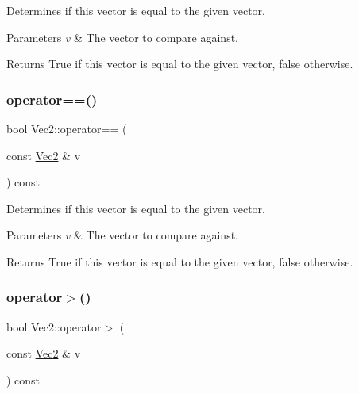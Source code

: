 Determines if this vector is equal to the given vector.


\begin{DoxyParams}{Parameters}
{\em v} & The vector to compare against.\\
\hline
\end{DoxyParams}
\begin{DoxyReturn}{Returns}
True if this vector is equal to the given vector, false otherwise. 
\end{DoxyReturn}
\mbox{\label{classVec2_a08e7dcf7a04bd18d56d41dc03104ba64}} 
\subsubsection{\texorpdfstring{operator==()}{operator==()}\hspace{0.1cm}{\footnotesize\ttfamily [2/2]}}
{\footnotesize\ttfamily bool Vec2\+::operator== (\begin{DoxyParamCaption}\item[{const \hyperlink{classVec2}{Vec2} \&}]{v }\end{DoxyParamCaption}) const\hspace{0.3cm}{\ttfamily [inline]}}

Determines if this vector is equal to the given vector.


\begin{DoxyParams}{Parameters}
{\em v} & The vector to compare against.\\
\hline
\end{DoxyParams}
\begin{DoxyReturn}{Returns}
True if this vector is equal to the given vector, false otherwise. 
\end{DoxyReturn}
\mbox{\label{classVec2_a40d9c6d4290844d86f27cb76fb8a3556}} 
\subsubsection{\texorpdfstring{operator$>$()}{operator>()}\hspace{0.1cm}{\footnotesize\ttfamily [1/2]}}
{\footnotesize\ttfamily bool Vec2\+::operator$>$ (\begin{DoxyParamCaption}\item[{const \hyperlink{classVec2}{Vec2} \&}]{v }\end{DoxyParamCaption}) const\hspace{0.3cm}{\ttfamily [inline]}}

